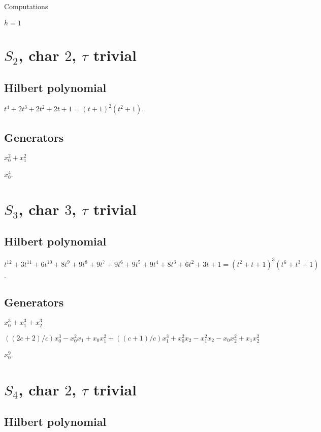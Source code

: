 \documentclass{article}
\numberwithin{equation}{section}
\begin{document}
{\Huge Computations}

{\huge $\bar{h}=1$}

\section{$S_2$, char $2$, $\tau$ trivial}

\subsection{Hilbert polynomial}

$t^4 + 2t^3 + 2t^2 + 2t + 1=(t + 1)^2  (t^2 + 1)$.

\subsection{Generators}

$x_0^2 + x_1^2$ 

$x_0^4$.

\section{$S_3$, char $3$, $\tau$ trivial}

\subsection{Hilbert polynomial}

$t^{12} + 3t^{11} + 6t^{10} + 8t^9 + 9t^8 + 9t^7 + 9t^6 + 9t^5 + 9t^4 +
8t^3 + 6t^2 + 3t + 1=(t^2 + t + 1)^3(t^6 + t^3 + 1)$.

\subsection{Generators}

 $x_0^3 + x_1^3 + x_2^3$ 

$((2c + 2)/c)x_0^3 - x_0^2x_1 + x_0x_1^2 +
((c + 1)/c)x_1^3 + x_0^2x_2 - x_1^2x_2 - x_0x_2^2 + x_1x_2^2$


$x_0^9$.



\section{$S_4$, char $2$, $\tau$ trivial}

\subsection{Hilbert polynomial}
\end{document}
